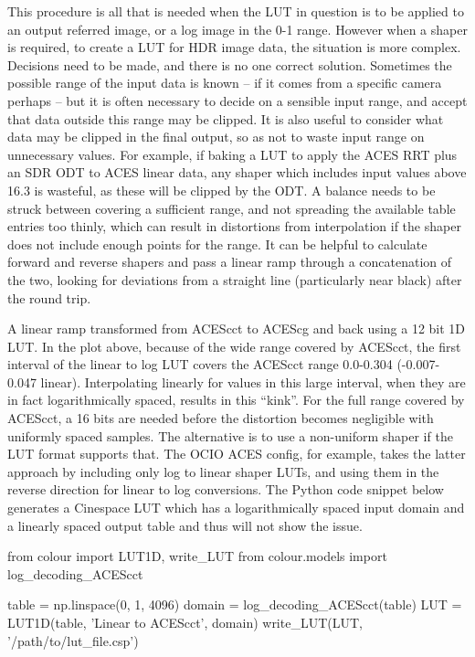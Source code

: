 This procedure is all that is needed when the LUT in question is to be applied to an output referred image, or a log image in the 0-1 range. However when a shaper is required, to create a LUT for HDR image data, the situation is more complex. Decisions need to be made, and there is no one correct solution. Sometimes the possible range of the input data is known – if it comes from a specific camera perhaps – but it is often necessary to decide on a sensible input range, and accept that data outside this range may be clipped. It is also useful to consider what data may be clipped in the final output, so as not to waste input range on unnecessary values. For example, if baking a LUT to apply the ACES RRT plus an SDR ODT to ACES linear data, any shaper which includes input values above 16.3 is wasteful, as these will be clipped by the ODT. A balance needs to be struck between covering a sufficient range, and not spreading the available table entries too thinly, which can result in distortions from interpolation if the shaper does not include enough points for the range. It can be helpful to calculate forward and reverse shapers and pass a linear ramp through a concatenation of the two, looking for deviations from a straight line (particularly near black) after the round trip.

A linear ramp transformed from ACEScct to ACEScg and back using a 12 bit 1D LUT.
In the plot above, because of the wide range covered by ACEScct, the first interval of the linear to log LUT covers the ACEScct range 0.0-0.304 (-0.007-0.047 linear). Interpolating linearly for values in this large interval, when they are in fact logarithmically spaced, results in this “kink”. For the full range covered by ACEScct, a 16 bits are needed before the distortion becomes negligible with uniformly spaced samples. The alternative is to use a non-uniform shaper if the LUT format supports that. The OCIO ACES config, for example, takes the latter approach by including only log to linear shaper LUTs, and using them in the reverse direction for linear to log conversions. The Python code snippet below generates a Cinespace LUT which has a logarithmically spaced input domain and a linearly spaced output table and thus will not show the issue.

from colour import LUT1D, write_LUT
from colour.models import log_decoding_ACEScct

table = np.linspace(0, 1, 4096)
domain = log_decoding_ACEScct(table)
LUT = LUT1D(table, 'Linear to ACEScct', domain)
write_LUT(LUT, '/path/to/lut_file.csp')

